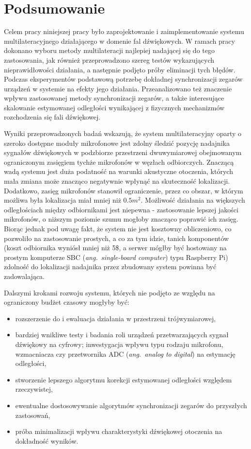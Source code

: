 \chapter*{Podsumowanie}\label{chap:podsumowanie}

Celem pracy niniejszej pracy było zaprojektowanie i zaimplementowanie systemu multilateracyjnego działającego w domenie fal dźwiękowych. W ramach pracy dokonano wyboru metody multilateracji najlepiej nadającej się do tego zastosowania, jak również przeprowadzono szereg testów wykazujących nieprawidłowości działania, a następnie podjęto próby eliminacji tych błędów. Podczas eksperymentów podstawową potrzebę dokładnej synchronizacji zegarów urządzeń w systemie na efekty jego działania. Przeanalizowano też znaczenie wpływu zastosowanej metody synchronizacji zegarów, a także interesujące skalowanie estymowanej odległości wynikającej z fizycznych mechanizmów rozchodzenia się fali dźwiękowej.

Wyniki przeprowadzonych badań wskazują, że system multilateracyjny oparty o szeroko dostępne moduły mikrofonowe jest zdolny śledzić pozycję nadajnika sygnałów dźwiękowych w podzbiorze przestrzeni dwuwymiarowej obejmowanym ograniczonym zasięgiem tychże mikrofonów w węzłach odbiorczych. Znaczącą wadą systemu jest duża podatność na warunki akustyczne otoczenia, których mała zmiana może znacząco negatywnie wpłynąć na skuteczność lokalizacji. Dodatkowo, zasięg mikrofonów stanowił ograniczenie, przez co obszar, w którym możliwa była lokalizacja miał mniej niż $0.5 m^2$. Możliwość działania na większych odległościach między odbiornikami jest niepewna {-} zastosowanie lepszej jakości mikrofonów, o niższym poziomie szumu mogłoby znacząco poprawić ich zasięg. Biorąc jednak pod uwagę fakt, że system nie jest kosztowny obliczeniowo, co pozwoliło na zastosowanie prostych, a co za tym idzie, tanich komponentów (koszt odbiornika wyniósł mniej niż 5\$, a serwer mógłby być hostowany na prostym komputerze SBC (\textit{ang.\ single-board computer}) typu Raspberry Pi) zdolność do lokalizacji nadajnika przez zbudowany system powinna być zadowalająca.

Dalszymi krokami rozwoju systemu, których nie podjęto ze względu na ograniczony budżet czasowy mogłyby być:

\begin{itemize}
    \item rozszerzenie do i ewaluacja działania w przestrzeni trójwymiarowej,
    \item bardziej wnikliwe testy i badania roli urządzeń przetwarzających sygnał dźwiękowy na cyfrowy; inwestygacja wpływu typu rodzaju mikrofonu, wzmacniacza czy przetwornika ADC (\textit{ang.\ analog to digital}) na estymację odległości,
    \item stworzenie lepszego algorytmu korekcji estymowanej odległości względem rzeczywistej,
    \item ewentualne dostosowywanie algorytmów synchronizacji zegarów do przyszłych zastosowań,
    \item próba minimalizacji wpływu charakterystyki dźwiękowej otoczenia na dokładność wyników.
\end{itemize}

